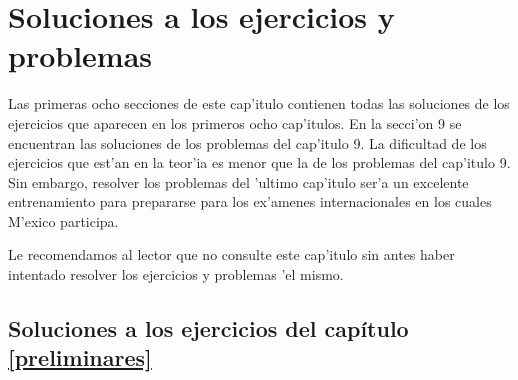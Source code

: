 \chapter{Soluciones a los ejercicios y problemas}
       
\noindent Las primeras ocho secciones de este cap'itulo contienen todas las 
soluciones de  los ejercicios que aparecen en los primeros ocho cap'itulos.  
En la secci'on 9  se encuentran las soluciones de los problemas del cap'itulo 9.  La dificultad de los ejercicios que est'an en la teor'ia es menor que la de los problemas del  cap'itulo 9.  Sin embargo, resolver los problemas del 'ultimo cap'itulo ser'a un excelente entrenamiento para prepararse para los ex'amenes internacionales en los cuales M'exico participa.
 
Le recomendamos al lector que no consulte este cap'itulo sin antes haber
intentado resolver los ejercicios y problemas 'el mismo.


\renewcommand{\sectionmark}[1]{\markright{\thesection\, Soluciones del cap\'itulo \ref{preliminares}}}
\section{Soluciones a los ejercicios del cap\'itulo \ref{preliminares}}
\label{sugcapuno}
\setcounter{sucprel}{0}
\setcounter{surefcprel}{0}
\def\xxeleccion{11}








